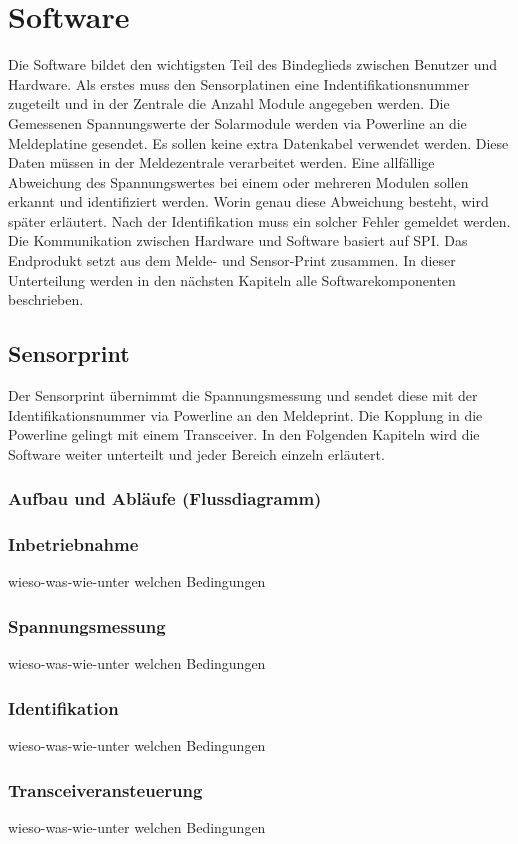  \section{Software}
Die Software bildet den wichtigsten Teil des Bindeglieds zwischen Benutzer und Hardware. Als erstes muss den Sensorplatinen eine Indentifikationsnummer zugeteilt und in der Zentrale die Anzahl Module angegeben werden. Die Gemessenen Spannungswerte der Solarmodule werden via Powerline an die Meldeplatine gesendet. Es sollen keine extra Datenkabel verwendet werden. Diese Daten müssen in der Meldezentrale verarbeitet werden. Eine allfällige Abweichung des Spannungswertes bei einem oder mehreren Modulen sollen erkannt und identifiziert werden. Worin genau diese Abweichung besteht, wird später erläutert. Nach der Identifikation muss ein solcher Fehler gemeldet werden. Die Kommunikation zwischen Hardware und Software basiert auf SPI. Das Endprodukt setzt aus dem Melde- und Sensor-Print zusammen. In dieser Unterteilung werden in den nächsten Kapiteln alle Softwarekomponenten beschrieben.
\subsection{Sensorprint}
Der Sensorprint übernimmt die Spannungsmessung und sendet diese mit der Identifikationsnummer via Powerline an den Meldeprint. Die Kopplung in die Powerline gelingt mit einem Transceiver. In den Folgenden Kapiteln wird die Software weiter unterteilt und jeder Bereich einzeln erläutert.
\subsubsection{Aufbau und Abläufe (Flussdiagramm)}
\subsubsection{Inbetriebnahme}
wieso-was-wie-unter welchen Bedingungen
\subsubsection{Spannungsmessung}
wieso-was-wie-unter welchen Bedingungen
\subsubsection{Identifikation}
wieso-was-wie-unter welchen Bedingungen
\subsubsection{Transceiveransteuerung}
wieso-was-wie-unter welchen Bedingungen
